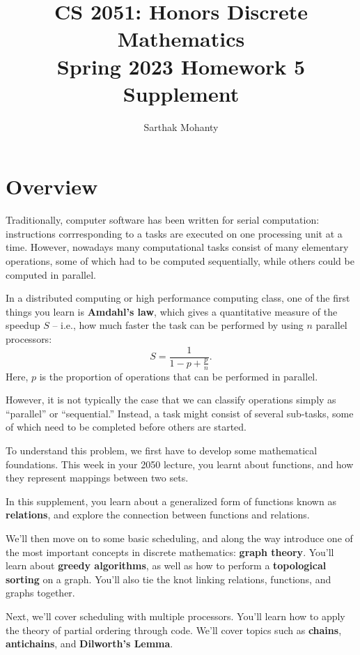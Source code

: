 \documentclass{article}
\title{\vspace{-1cm}CS 2051: Honors Discrete Mathematics \\Spring 2023 Homework 5 Supplement}
\author{Sarthak Mohanty }
\date{}
\begin{document}
\maketitle

\section*{Overview}
    Traditionally, computer software has been written for serial computation: instructions corrresponding to a tasks are executed on one processing unit at a time. However, nowadays many computational tasks consist of many elementary operations, some of which had to be computed sequentially, while others could be computed in parallel. 

  In a distributed computing or high performance computing class, one of the first things you learn is \textbf{Amdahl’s law}, which gives a quantitative measure of the speedup $S$ -- i.e., how much faster the task can be performed by using $n$ parallel processors:
  $$S = \frac{1}{1 - p + \frac{p}{n}}.$$ Here, $p$ is the proportion of operations that can be performed in parallel.

    \vspace{2mm}
    However, it is not typically the case that we can classify operations simply as “parallel” or “sequential.” Instead, a task might consist of several sub-tasks, some of which need to be completed before others are started. 

    \vspace{2mm}
    To understand this problem, we first have to develop some mathematical foundations. This week in your 2050 lecture, you learnt about functions, and how they represent mappings between two sets. 
    

    \vspace{2mm}
    In this supplement, you learn about a generalized form of functions known as \textbf{relations}, and explore the connection between functions and relations. 

    \vspace{2mm}
    We'll then move on to some basic scheduling, and along the way introduce one of the most important concepts in discrete mathematics: \textbf{graph theory}. You'll learn about \textbf{greedy algorithms}, as well as how to perform a \textbf{topological sorting} on a graph. You'll also tie the knot linking relations, functions, and graphs together.

    \vspace{2mm}
    Next, we'll cover scheduling with multiple processors. You'll learn how to apply the theory of partial ordering through code. We'll cover topics such as \textbf{chains}, \textbf{antichains}, and \textbf{Dilworth's Lemma}.
\end{document}
